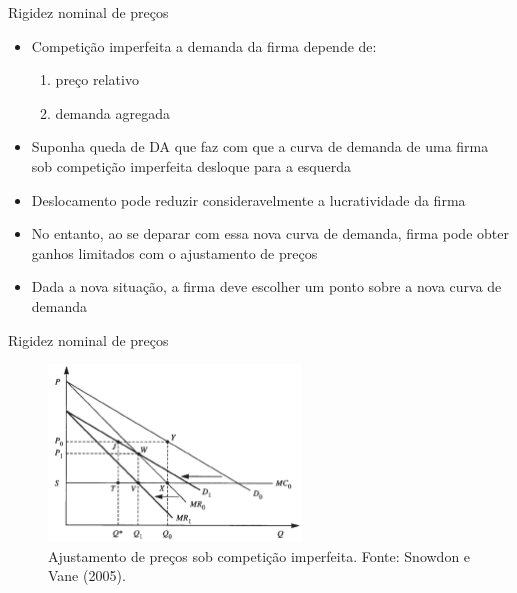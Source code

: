 \documentclass[10pt]{beamer}
\begin{document}
\begin{frame}{Rigidez nominal de preços}
    \begin{itemize}
        \item Competição imperfeita a demanda da firma depende de:\bigskip
        \begin{enumerate}
            \item preço relativo\bigskip
            \item demanda agregada\bigskip
        \end{enumerate}
        \item Suponha queda de DA que faz com que a curva de demanda de uma firma sob competição imperfeita desloque para a esquerda\bigskip
        \item Deslocamento pode reduzir consideravelmente a lucratividade da firma\bigskip
        \item No entanto, ao se deparar com essa nova curva de demanda, firma pode obter ganhos limitados com o ajustamento de preços\bigskip
        \item Dada a nova situação, a firma deve escolher um ponto sobre a nova curva de demanda
    \end{itemize}
\end{frame}
\begin{frame}{Rigidez nominal de preços}
    \begin{figure}
        \centering
        \includegraphics[width=0.6\textwidth]{./figures/aula15_fig3.PNG}
        \caption{Ajustamento de preços sob competição imperfeita. Fonte: Snowdon e Vane (2005).}
        \label{aula15_fig3}
    \end{figure}
\end{frame}
\end{document}
